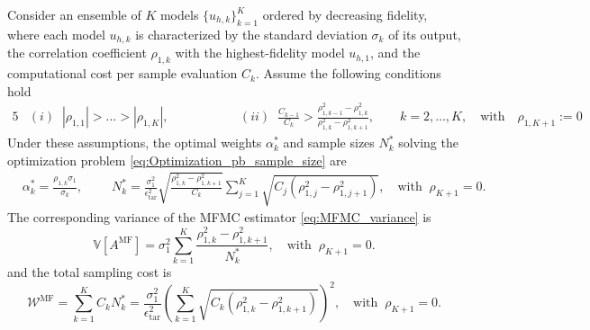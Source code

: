 %
\begin{theorem}
\label{thm:Sample_size_est}
Consider an ensemble of $K$ models $\{u_{h,k}\}_{k=1}^K$ ordered by decreasing fidelity, where each model $u_{h,k}$ is characterized by the standard deviation $\sigma_k$ of its output, the correlation coefficient $\rho_{1,k}$ with the highest-fidelity model $u_{h,1}$, and the computational cost per sample evaluation $C_k$. Assume the following conditions hold
%
\begin{alignat*}{5}
    &(i)\;\; |\rho_{1,1}|>\ldots>|\rho_{1,K}|,& \qquad \qquad
    &(ii)\;\; \frac{C_{k-1}}{C_k}>\frac{\rho_{1,k-1}^2-\rho_{1,k}^2}{\rho_{1,k}^2-\rho_{1,k+1}^2},\quad \quad k=2,\ldots,K,  \quad \text{with} \quad \rho_{1,K+1} := 0
\end{alignat*}
%
Under these assumptions, the optimal weights $\alpha_k^*$ and sample sizes $N_k^*$ solving the optimization problem \eqref{eq:Optimization_pb_sample_size} are
%
\begin{align}
    \label{eq:MFMC_SampleSize}
    &\alpha_k^*=\frac{\rho_{1,k}\sigma_1}{\sigma_k},\qquad \;N_k^*=\frac{\sigma_1^2}{\epsilon_\text{tar}^2}\sqrt{\frac{\rho_{1,k}^2-\rho_{1,k+1}^2}{C_k}}\sum_{j=1}^K\sqrt{C_j\left(\rho_{1,j}^2-\rho_{1,j+1}^2\right)}, \quad \text{with}\;\;\rho_{K+1}=0.
\end{align}
%
The corresponding variance of the MFMC estimator \eqref{eq:MFMC_variance} is
%
\begin{equation}
\label{eq:MFMC_variance_optimal}
\mathbb{V}\left[A^{\text{MF}}\right] =
\sigma_1^2 \sum_{k=1}^K\frac{\rho_{1,k}^2 - \rho_{1,k+1}^2}{N_k^*},\quad \text{with}\;\;\rho_{K+1}=0.
\end{equation}
%
and the total sampling cost is
%
\begin{equation}\label{eq:MFMC_sampling_cost}
    \mathcal{W}^\text{MF} = \sum_{k=1}^K C_k N_k^* = \frac{\sigma_1^2}{\epsilon_{\text{tar}}^2}\left(\sum_{k=1}^K\sqrt{C_k\left(\rho_{1,k}^2 - \rho_{1,k+1}^2\right)}\right)^2,\quad \text{with}\;\;\rho_{K+1}=0.
\end{equation}
%
\end{theorem}

